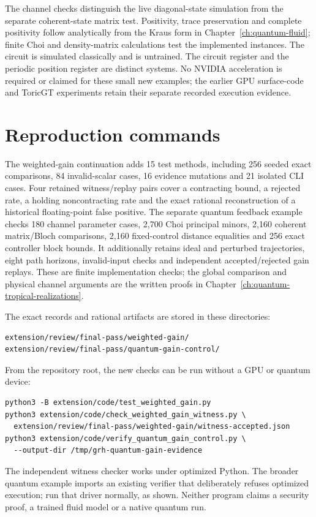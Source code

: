 The channel checks distinguish the live diagonal-state simulation from the separate coherent-state matrix test. Positivity, trace preservation and complete positivity follow analytically from the Kraus form in Chapter~\ref{ch:quantum-fluid}; finite Choi and density-matrix calculations test the implemented instances. The circuit is simulated classically and is untrained. The circuit register and the periodic position register are distinct systems. No NVIDIA acceleration is required or claimed for these small new examples; the earlier GPU surface-code and ToricGT experiments retain their separate recorded execution evidence.

\section{Reproduction commands}

The weighted-gain continuation adds 15 test methods, including 256 seeded
exact comparisons, 84 invalid-scalar cases, 16 evidence mutations and 21
isolated CLI cases. Four retained witness/replay pairs cover a contracting
bound, a rejected rate, a holding noncontracting rate and the exact rational
reconstruction of a historical floating-point false positive. The separate
quantum feedback example checks 180 channel parameter cases, 2,700 Choi
principal minors, 2,160 coherent matrix/Bloch comparisons, 2,160
fixed-control distance equalities and 256 exact controller block bounds.
It additionally retains ideal and perturbed trajectories, eight path
horizons, invalid-input checks and independent accepted/rejected gain
replays. These are finite implementation checks; the global comparison
and physical channel arguments are the written proofs in
Chapter~\ref{ch:quantum-tropical-realizations}.

The exact records and rational artifacts are stored in these directories:
\begin{lstlisting}
extension/review/final-pass/weighted-gain/
extension/review/final-pass/quantum-gain-control/
\end{lstlisting}
From the repository root, the new checks can be run without a GPU or
quantum device:
\begin{lstlisting}
python3 -B extension/code/test_weighted_gain.py
python3 extension/code/check_weighted_gain_witness.py \
  extension/review/final-pass/weighted-gain/witness-accepted.json
python3 extension/code/verify_quantum_gain_control.py \
  --output-dir /tmp/grh-quantum-gain-evidence
\end{lstlisting}
The independent witness checker works under optimized Python. The broader
quantum example imports an existing verifier that deliberately refuses
optimized execution; run that driver normally, as shown. Neither program
claims a security proof, a trained fluid model or a native quantum run.

